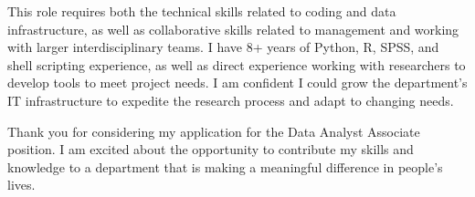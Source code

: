 This role requires both the technical skills related to coding and data infrastructure,
as well as collaborative skills related to management and working with larger
interdisciplinary teams. I have 8+ years of Python, R, SPSS, and shell scripting
experience, as well as direct experience working with researchers to develop tools to
meet project needs. I am confident I could grow the department's IT infrastructure to
expedite the research process and adapt to changing needs. \par Thank you for
considering my application for the Data Analyst Associate position. I am
excited about the opportunity to contribute my skills and knowledge to a department that
is making a meaningful difference in people's lives.